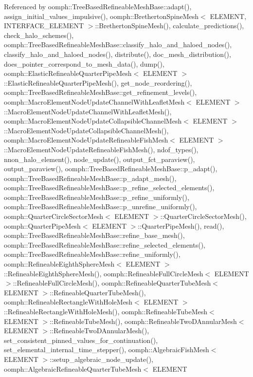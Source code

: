 Referenced by oomph\+::\+Tree\+Based\+Refineable\+Mesh\+Base\+::adapt(), assign\+\_\+initial\+\_\+values\+\_\+impulsive(), oomph\+::\+Bretherton\+Spine\+Mesh$<$ E\+L\+E\+M\+E\+N\+T, I\+N\+T\+E\+R\+F\+A\+C\+E\+\_\+\+E\+L\+E\+M\+E\+N\+T $>$\+::\+Bretherton\+Spine\+Mesh(), calculate\+\_\+predictions(), check\+\_\+halo\+\_\+schemes(), oomph\+::\+Tree\+Based\+Refineable\+Mesh\+Base\+::classify\+\_\+halo\+\_\+and\+\_\+haloed\+\_\+nodes(), classify\+\_\+halo\+\_\+and\+\_\+haloed\+\_\+nodes(), distribute(), doc\+\_\+mesh\+\_\+distribution(), does\+\_\+pointer\+\_\+correspond\+\_\+to\+\_\+mesh\+\_\+data(), dump(), oomph\+::\+Elastic\+Refineable\+Quarter\+Pipe\+Mesh$<$ E\+L\+E\+M\+E\+N\+T $>$\+::\+Elastic\+Refineable\+Quarter\+Pipe\+Mesh(), get\+\_\+node\+\_\+reordering(), oomph\+::\+Tree\+Based\+Refineable\+Mesh\+Base\+::get\+\_\+refinement\+\_\+levels(), oomph\+::\+Macro\+Element\+Node\+Update\+Channel\+With\+Leaflet\+Mesh$<$ E\+L\+E\+M\+E\+N\+T $>$\+::\+Macro\+Element\+Node\+Update\+Channel\+With\+Leaflet\+Mesh(), oomph\+::\+Macro\+Element\+Node\+Update\+Collapsible\+Channel\+Mesh$<$ E\+L\+E\+M\+E\+N\+T $>$\+::\+Macro\+Element\+Node\+Update\+Collapsible\+Channel\+Mesh(), oomph\+::\+Macro\+Element\+Node\+Update\+Refineable\+Fish\+Mesh$<$ E\+L\+E\+M\+E\+N\+T $>$\+::\+Macro\+Element\+Node\+Update\+Refineable\+Fish\+Mesh(), ndof\+\_\+types(), nnon\+\_\+halo\+\_\+element(), node\+\_\+update(), output\+\_\+fct\+\_\+paraview(), output\+\_\+paraview(), oomph\+::\+Tree\+Based\+Refineable\+Mesh\+Base\+::p\+\_\+adapt(), oomph\+::\+Tree\+Based\+Refineable\+Mesh\+Base\+::p\+\_\+adapt\+\_\+mesh(), oomph\+::\+Tree\+Based\+Refineable\+Mesh\+Base\+::p\+\_\+refine\+\_\+selected\+\_\+elements(), oomph\+::\+Tree\+Based\+Refineable\+Mesh\+Base\+::p\+\_\+refine\+\_\+uniformly(), oomph\+::\+Tree\+Based\+Refineable\+Mesh\+Base\+::p\+\_\+unrefine\+\_\+uniformly(), oomph\+::\+Quarter\+Circle\+Sector\+Mesh$<$ E\+L\+E\+M\+E\+N\+T $>$\+::\+Quarter\+Circle\+Sector\+Mesh(), oomph\+::\+Quarter\+Pipe\+Mesh$<$ E\+L\+E\+M\+E\+N\+T $>$\+::\+Quarter\+Pipe\+Mesh(), read(), oomph\+::\+Tree\+Based\+Refineable\+Mesh\+Base\+::refine\+\_\+base\+\_\+mesh(), oomph\+::\+Tree\+Based\+Refineable\+Mesh\+Base\+::refine\+\_\+selected\+\_\+elements(), oomph\+::\+Tree\+Based\+Refineable\+Mesh\+Base\+::refine\+\_\+uniformly(), oomph\+::\+Refineable\+Eighth\+Sphere\+Mesh$<$ E\+L\+E\+M\+E\+N\+T $>$\+::\+Refineable\+Eighth\+Sphere\+Mesh(), oomph\+::\+Refineable\+Full\+Circle\+Mesh$<$ E\+L\+E\+M\+E\+N\+T $>$\+::\+Refineable\+Full\+Circle\+Mesh(), oomph\+::\+Refineable\+Quarter\+Tube\+Mesh$<$ E\+L\+E\+M\+E\+N\+T $>$\+::\+Refineable\+Quarter\+Tube\+Mesh(), oomph\+::\+Refineable\+Rectangle\+With\+Hole\+Mesh$<$ E\+L\+E\+M\+E\+N\+T $>$\+::\+Refineable\+Rectangle\+With\+Hole\+Mesh(), oomph\+::\+Refineable\+Tube\+Mesh$<$ E\+L\+E\+M\+E\+N\+T $>$\+::\+Refineable\+Tube\+Mesh(), oomph\+::\+Refineable\+Two\+D\+Annular\+Mesh$<$ E\+L\+E\+M\+E\+N\+T $>$\+::\+Refineable\+Two\+D\+Annular\+Mesh(), set\+\_\+consistent\+\_\+pinned\+\_\+values\+\_\+for\+\_\+continuation(), set\+\_\+elemental\+\_\+internal\+\_\+time\+\_\+stepper(), oomph\+::\+Algebraic\+Fish\+Mesh$<$ E\+L\+E\+M\+E\+N\+T $>$\+::setup\+\_\+algebraic\+\_\+node\+\_\+update(), oomph\+::\+Algebraic\+Refineable\+Quarter\+Tube\+Mesh$<$ E\+L\+E\+M\+E\+N\+T 